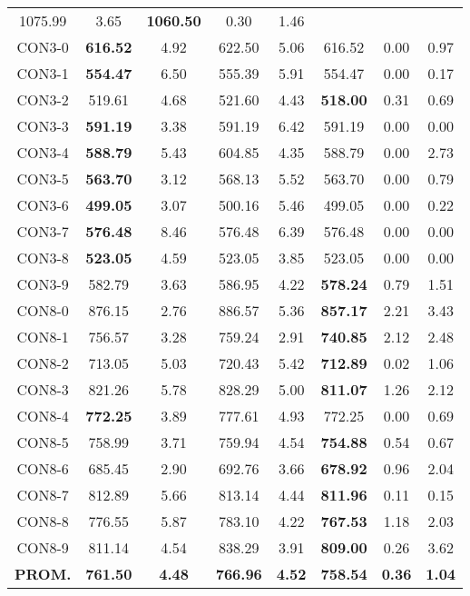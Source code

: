 \begin{table}[h]
\begin{tabular}{c c c c c c c c}
1075.99 & 3.65 & \bf{1060.50} & 
0.30 & 1.46\\CON3-0 & \bf{616.52} & 4.92 & 
622.50 & 5.06 & 616.52 & 0.00
 & 0.97\\CON3-1 & \bf{554.47} & 6.50 & 
555.39 & 5.91 & 554.47 & 0.00
 & 0.17\\CON3-2 & 519.61 & 4.68 & 
521.60 & 4.43 & \bf{518.00} & 
0.31 & 0.69\\CON3-3 & \bf{591.19} & 3.38 & 
591.19 & 6.42 & 591.19 & 0.00
 & 0.00\\
CON3-4 & \bf{588.79} & 5.43 & 
604.85 & 4.35 & 588.79 & 0.00
 & 2.73\\CON3-5 & \bf{563.70} & 3.12 & 
568.13 & 5.52 & 563.70 & 0.00
 & 0.79\\CON3-6 & \bf{499.05} & 3.07 & 
500.16 & 5.46 & 499.05 & 0.00
 & 0.22\\CON3-7 & \bf{576.48} & 8.46 & 
576.48 & 6.39 & 576.48 & 0.00
 & 0.00\\
CON3-8 & \bf{523.05} & 4.59 & 
523.05 & 3.85 & 523.05 & 0.00
 & 0.00\\
CON3-9 & 582.79 & 3.63 & 
586.95 & 4.22 & \bf{578.24} & 
0.79 & 1.51\\CON8-0 & 876.15 & 2.76 & 
886.57 & 5.36 & \bf{857.17} & 
2.21 & 3.43\\CON8-1 & 756.57 & 3.28 & 
759.24 & 2.91 & \bf{740.85} & 
2.12 & 2.48\\CON8-2 & 713.05 & 5.03 & 
720.43 & 5.42 & \bf{712.89} & 
0.02 & 1.06\\CON8-3 & 821.26 & 5.78 & 
828.29 & 5.00 & \bf{811.07} & 
1.26 & 2.12\\CON8-4 & \bf{772.25} & 3.89 & 
777.61 & 4.93 & 772.25 & 0.00
 & 0.69\\CON8-5 & 758.99 & 3.71 & 
759.94 & 4.54 & \bf{754.88} & 
0.54 & 0.67\\CON8-6 & 685.45 & 2.90 & 
692.76 & 3.66 & \bf{678.92} & 
0.96 & 2.04\\CON8-7 & 812.89 & 5.66 & 
813.14 & 4.44 & \bf{811.96} & 
0.11 & 0.15\\CON8-8 & 776.55 & 5.87 & 
783.10 & 4.22 & \bf{767.53} & 
1.18 & 2.03\\CON8-9 & 811.14 & 4.54 & 
838.29 & 3.91 & \bf{809.00} & 
0.26 & 3.62\\\bf{PROM.} & 
\bf{761.50} & \bf{4.48} & \bf{766.96} & \bf{4.52} & \bf{758.54} & \bf{0.36} & \bf{1.04}\\[1ex]\hline
\end{tabular}
\label{table:nonlin}
\end{table}
